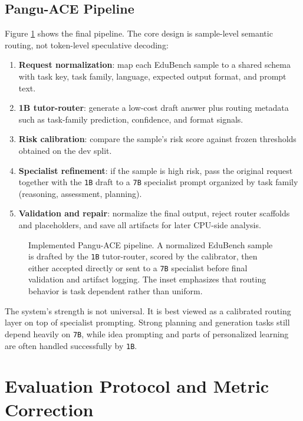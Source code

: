 \documentclass{article}
\begin{document}
\subsection{Pangu-ACE Pipeline}
Figure \ref{fig:system_overview} shows the final pipeline. The core design is sample-level semantic routing, not token-level speculative decoding:
\begin{enumerate}
    \item \textbf{Request normalization}: map each EduBench sample to a shared schema with task key, task family, language, expected output format, and prompt text.
    \item \textbf{1B tutor-router}: generate a low-cost draft answer plus routing metadata such as task-family prediction, confidence, and format signals.
    \item \textbf{Risk calibration}: compare the sample's risk score against frozen thresholds obtained on the dev split.
    \item \textbf{Specialist refinement}: if the sample is high risk, pass the original request together with the \texttt{1B} draft to a \texttt{7B} specialist prompt organized by task family (reasoning, assessment, planning).
    \item \textbf{Validation and repair}: normalize the final output, reject router scaffolds and placeholders, and save all artifacts for later CPU-side analysis.
\end{enumerate}

\begin{figure}[H]
  \centering
  
  \caption{Implemented Pangu-ACE pipeline. A normalized EduBench sample is drafted by the \texttt{1B} tutor-router, scored by the calibrator, then either accepted directly or sent to a \texttt{7B} specialist before final validation and artifact logging. The inset emphasizes that routing behavior is task dependent rather than uniform.}
  \label{fig:system_overview}
\end{figure}
\FloatBarrier

The system's strength is not universal. It is best viewed as a calibrated routing layer on top of specialist prompting. Strong planning and generation tasks still depend heavily on \texttt{7B}, while idea prompting and parts of personalized learning are often handled successfully by \texttt{1B}.

\section{Evaluation Protocol and Metric Correction}
\end{document}
